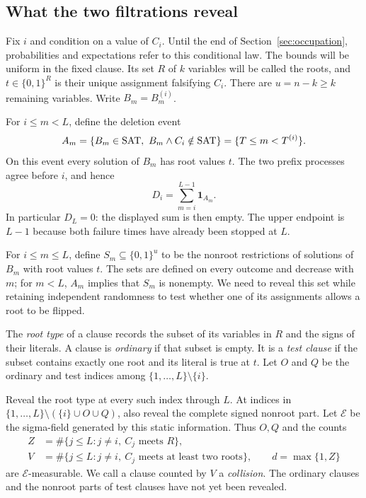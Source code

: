 \subsection{What the two filtrations reveal}

Fix \(i\) and condition on a value of \(C_i\).  Until the end of
Section~\ref{sec:occupation}, probabilities and expectations refer to
this conditional law.  The bounds will be uniform in the fixed clause.
Its set \(R\) of \(k\) variables will be called the roots, and
\(t\in\{0,1\}^{R}\) is their unique assignment falsifying \(C_i\).
There are \(u=n-k\ge k\) remaining variables.  Write \(B_m=B_m^{(i)}\).

For \(i\le m<L\), define the deletion event
\begin{equation}\label{eq:deletion-events}
 A_m=\{B_m\in\mathrm{SAT},\ B_m\wedge C_i\notin\mathrm{SAT}\}
     =\{T\le m<T^{(i)}\}.
\end{equation}
On this event every solution of \(B_m\) has root values \(t\).
The two prefix processes agree before \(i\), and hence
\begin{equation}\label{eq:delay-identity}
 D_i=\sum_{m=i}^{L-1}\mathbf1_{A_m}.
\end{equation}
In particular \(D_L=0\): the displayed sum is then empty.  The upper
endpoint is \(L-1\) because both failure times have already been
stopped at \(L\).

For \(i\le m\le L\), define \(S_m\subseteq\{0,1\}^{u}\) to be the
nonroot restrictions of solutions of \(B_m\) with root values \(t\).
The sets are defined on every outcome and decrease with \(m\); for
\(m<L\), \(A_m\) implies that \(S_m\) is nonempty.  We need to reveal
this set while retaining independent randomness to test whether one
of its assignments allows a root to be flipped.

The \emph{root type} of a clause records the subset of its variables
in \(R\) and the signs of their literals.  A clause is \emph{ordinary}
if that subset is empty.  It is a \emph{test clause} if the subset
contains exactly one root and its literal is true at \(t\).  Let
\(O\) and \(Q\) be the ordinary and test indices among
\(\{1,\ldots,L\}\setminus\{i\}\).

Reveal the root type at every such index through \(L\).  At indices in
\(\{1,\ldots,L\}\setminus(\{i\}\cup O\cup Q)\), also reveal the
complete signed nonroot part.
Let \(\mathcal E\) be the sigma-field generated by this static
information.  Thus \(O,Q\) and the counts
\begin{equation}\label{eq:global-root-counts}
\begin{split}
 Z&=\#\{j\le L:j\ne i,\ C_j\text{ meets }R\},\\
 V&=\#\{j\le L:j\ne i,\ C_j\text{ meets at least two roots}\},
 \qquad d=\max\{1,Z\}
\end{split}
\end{equation}
are \(\mathcal E\)-measurable.  We call a clause counted by \(V\)
a \emph{collision}.  The ordinary clauses and the nonroot parts of
test clauses have not yet been revealed.

